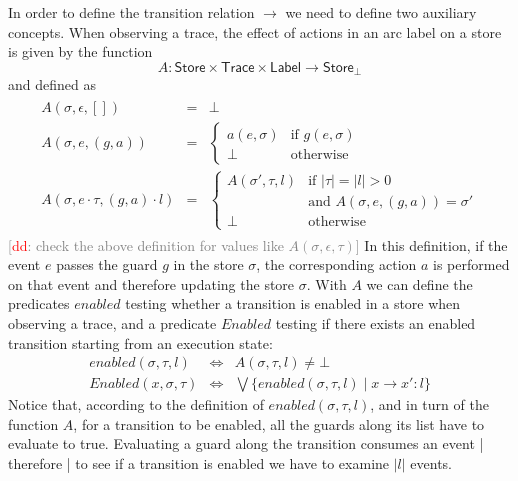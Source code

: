 \documentclass{sigplanconf}[10pt] %
\newcommand{\noterg}[2]{\textcolor{gray}{[\textcolor{red}{#1}: #2]}}
\newcommand{\dd}[1]{\noterg{dd}{#1}}
\newcommand{\dinocomment}[1]{\dd{#1}}
\newcommand{\set}[1]{\ensuremath{\mathsf{#1}}}
\begin{document}
In order to define the transition relation $\to$ we need to define two auxiliary concepts. 
When observing a trace, the effect of actions in an arc label on a store  is given by the function
\[
   A : \set{Store} \times \set{Trace} \times \set{Label} \to \set{Store}_\bot
\] and defined as
%
\[
\begin{array}{c}
\begin{array}{lcl}
A(\sigma,\epsilon,[]) & = & \bot
\\[2ex]
A(\sigma,e,(g,a)) & = & \left\{\begin{array}{ll}
     a(e,\sigma) & \mbox{if $g(e,\sigma)$}
     \\[1ex]
     \bot & \mbox{otherwise}
     \end{array}
     \right.
\\[5ex]
A(\sigma,e\cdot \tau,(g,a)\cdot l) & = & \left\{\begin{array}{ll}
     A(\sigma',\tau,l) & \mbox{if $|\tau|=|l|>0$} 
     \\
& \mbox{and  $A(\sigma,e,(g,a))=\sigma'$}
     \\[1ex]
     \bot & \mbox{otherwise}
     \end{array}
     \right.
\end{array}
\end{array}\]
\dinocomment{check the above definition for values like $A(\sigma,\epsilon,\tau)$}
In this definition, if the event $e$ passes the guard $g$ in the store $\sigma$, the corresponding action $a$ is performed on that event
and therefore updating the store $\sigma$.
With $A$ we can define the predicates $enabled$
testing whether a transition is enabled in a store when observing a trace,  and a predicate
$Enabled$ testing if there exists an enabled transition starting from an execution state:
\begin{eqnarray*}
enabled(\sigma,\tau,l) & \Leftrightarrow & A(\sigma,\tau,l) \neq \bot
\\
Enabled(x,\sigma,\tau) & \Leftrightarrow  & \bigvee \{ enabled(\sigma,\tau,l) \mid x \to x' : l \}
\end{eqnarray*}
Notice that, according to the definition of $enabled(\sigma,\tau,l)$, and in turn of the function $A$, 
for a transition to be enabled, all the guards along its
list have to evaluate to true. Evaluating a guard along the transition consumes
an event |  therefore | to see if a transition is enabled 
we have to examine $|l|$ events. 
\end{document}
